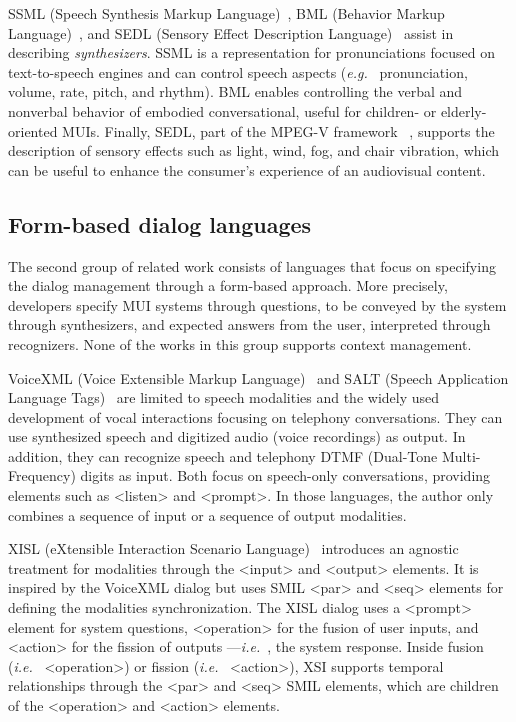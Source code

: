 \documentclass[
  doutorado,
  american
]{ThesisPUC}
\begin{document}
SSML (Speech Synthesis Markup Language)~\cite{daniel_c._burnett_speech_2010},
BML (Behavior Markup Language)~\cite{vilhjalmsson_behavior_2007}, and SEDL
(Sensory Effect Description Language)~\cite{iso/iec_iso/iec_2013} assist in
describing \textit{synthesizers}. SSML is a representation for pronunciations
focused on text-to-speech engines and can control speech aspects (\textit{e.g.}~
pronunciation, volume, rate, pitch, and rhythm). BML enables controlling the
verbal and nonverbal behavior of embodied conversational, useful for children-
or elderly-oriented MUIs. Finally, SEDL, part of the MPEG-V framework
~\cite{iso/iec_iso/iec_2014}, supports the description of sensory effects such
as light, wind, fog, and chair vibration, which can be useful to enhance the
consumer’s experience of an audiovisual content.

\subsection{Form-based dialog languages}
\label{sec:state:dialog}

The second group of related work consists of languages that focus on specifying
the dialog management through a form-based approach. More precisely, developers
specify MUI systems through questions, to be conveyed by the system through
synthesizers, and expected answers from the user, interpreted through
recognizers. None of the works in this group supports context management.

VoiceXML (Voice Extensible Markup Language)~\cite{w3c_voice_2007} and SALT
(Speech Application Language Tags)~\cite{microsoft_speech_2003} are limited
to speech modalities and the widely used development of vocal interactions
focusing on telephony conversations. They can use synthesized speech and
digitized audio (voice recordings) as output. In addition, they can recognize
speech and telephony DTMF (Dual-Tone Multi-Frequency) digits as input. Both
focus on speech-only conversations, providing elements such as <listen> and
<prompt>. In those languages, the author only combines a sequence of input or a
sequence of output modalities.

XISL (eXtensible Interaction Scenario Language)~\cite{katsurada_xisl:_2005} 
introduces an agnostic
treatment for modalities through the <input> and <output> elements. It is
inspired by the VoiceXML dialog but uses SMIL <par> and <seq> elements for
defining the modalities synchronization. The XISL dialog uses a <prompt> element
for system questions, <operation> for the fusion of user inputs, and <action>
for the fission of outputs —\textit{i.e.}~, the system response. Inside fusion (\textit{i.e.}~
<operation>) or fission (\textit{i.e.}~ <action>), XSI supports temporal relationships
through the <par> and <seq> SMIL elements, which are children of the <operation>
and <action> elements. 
\end{document}
